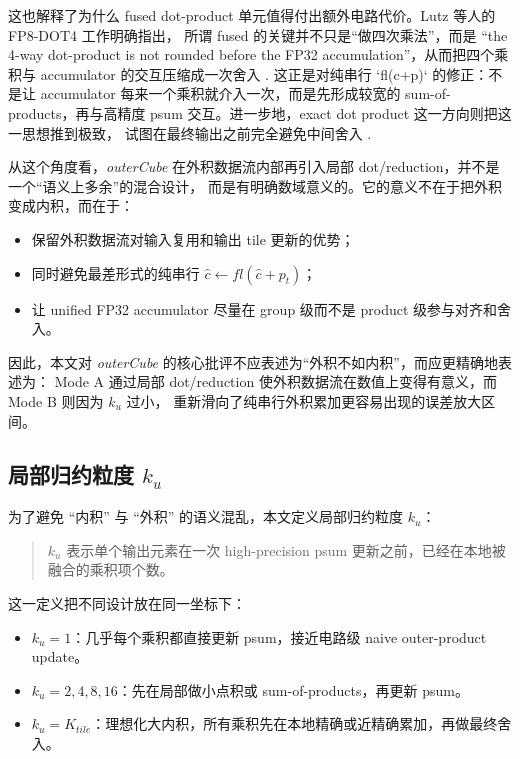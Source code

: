 \documentclass[UTF8,11pt,a4paper]{ctexart}
\newcommand{\ku}{\ensuremath{k_u}}
\newcommand{\modea}{Mode A}
\newcommand{\modeb}{Mode B}
\newcommand{\outercube}{\textit{outerCube}}
\begin{document}
这也解释了为什么 fused dot-product 单元值得付出额外电路代价。Lutz 等人的 FP8-DOT4 工作明确指出，
所谓 fused 的关键并不只是“做四次乘法”，而是 ``the 4-way dot-product is not rounded before the
FP32 accumulation''，从而把四个乘积与 accumulator 的交互压缩成一次舍入 \cite{lutz2024}.
这正是对纯串行 `fl(c+p)` 的修正：不是让 accumulator 每来一个乘积就介入一次，而是先形成较宽的
sum-of-products，再与高精度 psum 交互。进一步地，exact dot product 这一方向则把这一思想推到极致，
试图在最终输出之前完全避免中间舍入 \cite{exactdot}.

从这个角度看，\outercube{} 在外积数据流内部再引入局部 dot/reduction，并不是一个“语义上多余”的混合设计，
而是有明确数域意义的。它的意义不在于把外积变成内积，而在于：
\begin{itemize}
  \item 保留外积数据流对输入复用和输出 tile 更新的优势；
  \item 同时避免最差形式的纯串行 $\hat{c}\leftarrow fl(\hat{c}+p_t)$；
  \item 让 unified FP32 accumulator 尽量在 group 级而不是 product 级参与对齐和舍入。
\end{itemize}

因此，本文对 \outercube{} 的核心批评不应表述为“外积不如内积”，而应更精确地表述为：
\modea{} 通过局部 dot/reduction 使外积数据流在数值上变得有意义，而 \modeb{} 则因为 \ku{} 过小，
重新滑向了纯串行外积累加更容易出现的误差放大区间。

\subsection{局部归约粒度 $\ku$}

为了避免 ``内积'' 与 ``外积'' 的语义混乱，本文定义局部归约粒度 $\ku$：

\begin{quote}
  $\ku$ 表示单个输出元素在一次 high-precision psum 更新之前，已经在本地被融合的乘积项个数。
\end{quote}

这一定义把不同设计放在同一坐标下：

\begin{itemize}
  \item $\ku=1$：几乎每个乘积都直接更新 psum，接近电路级 naive outer-product update。
  \item $\ku=2,4,8,16$：先在局部做小点积或 sum-of-products，再更新 psum。
  \item $\ku=K_{tile}$：理想化大内积，所有乘积先在本地精确或近精确累加，再做最终舍入。
\end{itemize}
\end{document}
